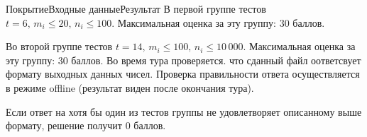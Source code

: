 \begin{problem}{Покрытие}{Входные данные}{Результат}{}
В первой группе тестов $t = 6,\, m_i \leqslant 20,\, n_i \leqslant 100$. Максимальная оценка за эту группу: $30$ баллов. 

Во второй группе тестов $t = 14,\, m_i \leqslant 100,\, n_i \leqslant 10\,000$. Максимальная оценка за эту группу: $30$ баллов. Во время тура проверяется. что сданный файл оответсвует формату выходных данных чисел. Проверка правильности ответа осуществляется в режиме offline (результат виден после окончания тура).

Если ответ на хотя бы один из тестов группы не удовлетворяет описанному выше формату, решение получит 0 баллов. 

\end{problem} 
